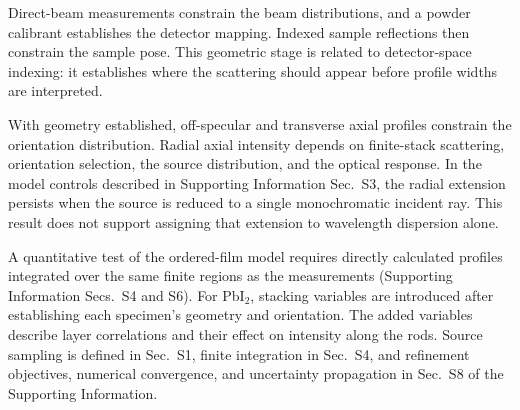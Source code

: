Direct-beam measurements constrain the beam distributions, and a powder calibrant establishes the detector mapping. Indexed sample reflections then constrain the sample pose. This geometric stage is related to detector-space indexing: it establishes where the scattering should appear before profile widths are interpreted.\cite{SmilgiesLi2026IndexGIXS}

With geometry established, off-specular and transverse axial profiles constrain the orientation distribution. Radial axial intensity depends on finite-stack scattering, orientation selection, the source distribution, and the optical response. In the model controls described in Supporting Information Sec.~S3, the radial extension persists when the source is reduced to a single monochromatic incident ray. This result does not support assigning that extension to wavelength dispersion alone.

A quantitative test of the ordered-film model requires directly calculated profiles integrated over the same finite regions as the measurements (Supporting Information Secs.~S4 and S6). For PbI$_2$, stacking variables are introduced after establishing each specimen's geometry and orientation. The added variables describe layer correlations and their effect on intensity along the rods. Source sampling is defined in Sec.~S1, finite integration in Sec.~S4, and refinement objectives, numerical convergence, and uncertainty propagation in Sec.~S8 of the Supporting Information.

